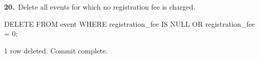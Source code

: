 \noindent\begin{minipage}{\linewidth}
\begingroup{}
{\fontsize{14}{17}\selectfont\textbf{20.}}\ Delete all events for which no registration fee is charged.\par
\endgroup\vspace{12pt}


\begin{sqlcode}
DELETE FROM event WHERE registration_fee IS NULL OR registration_fee = 0;
\end{sqlcode}

\vspace{18pt}


\begin{sqlout}[fontsize=\small]
1 row deleted.
Commit complete.
\end{sqlout}
\end{minipage}\par\vspace{24pt}

